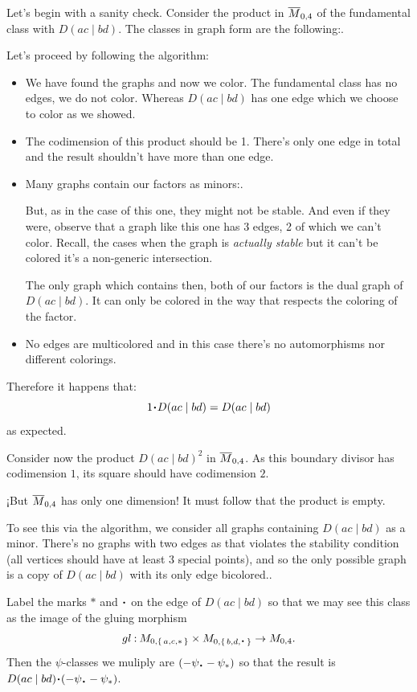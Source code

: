 \documentclass[12pt]{memoir}
\begin{document}
\begin{Ex}
    Let's begin with a sanity check. Consider the product in $\overline M_{0,4}$ of the fundamental class with $D(ac\mid bd)$. The classes in graph form are the following:.\par
    Let's proceed by following the algorithm:
    \begin{itemize}
        \item We have found the graphs and now we color. The fundamental class has no edges, we do not color. Whereas $D(ac\mid bd)$ has one edge which we choose to color as we showed.
        \item The codimension of this product should be 1. There's only one edge in total and the result shouldn't have more than one edge.
        \item Many graphs contain our factors as minors:.\par
        But, as in the case of this one, they might not be stable. And even if they were, observe that a graph like this one has 3 edges, 2 of which we can't color. Recall, the cases when the graph is \emph{actually stable} but it can't be colored it's a non-generic intersection.\par
        The only graph which contains then, both of our factors is the dual graph of $D(ac\mid bd)$. It can only be colored in the way that respects the coloring of the factor.
        \item No edges are multicolored and in this case there's no automorphisms nor different colorings.
    \end{itemize}
    Therefore it happens that:
    $$1\.D(ac\mid bd)=D(ac\mid bd)$$
    as expected.
\end{Ex}

\begin{Ex}
    Consider now the product $D(ac\mid bd)^2$ in $\overline{M}_{0,4}$. As this boundary divisor has codimension $1$, its square should have codimension $2$.\par
    ¡But $\overline{M}_{0,4}$ has only one dimension! It must follow that the product is empty.\par
    To see this via the algorithm, we consider all graphs containing $D(ac\mid bd)$ as a minor. There's no graphs with two edges as that violates the stability condition (all vertices should have at least 3 special points), and so the only possible graph is a copy of $D(ac\mid bd)$ with its only edge bicolored..\par
    Label the marks $\ast$ and $\.$ on the edge of $D(ac\mid bd)$ so that we may see this class as the image of the gluing morphism 
    $$gl\: M_{0,\set{a,c,\ast}}\x M_{0,\set{b,d,\.}}\to M_{0,4}.$$
    Then the $\psi$-classes we muliply are $(-\psi_{\.}-\psi_{\ast})$ so that the result is $D(ac\mid bd)\.(-\psi_{\.}-\psi_{\ast})$.\par
\end{Ex}
\end{document}
